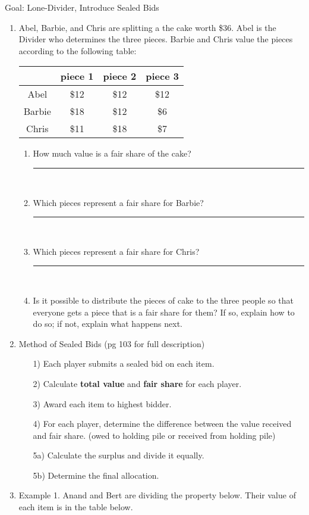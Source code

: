 \documentclass[12pt]{article}
\newcommand{\ans}[1][1in]{\rule{#1}{.5pt}}
\begin{document}
Goal: Lone-Divider, Introduce Sealed Bids
\begin{enumerate}
\item Abel, Barbie, and Chris are splitting a the cake worth \$36. Abel is the Divider who determines the three pieces. Barbie and Chris value the pieces according to the following table:

\begin{center}
\begin{tabular}{| c | c | c | c |}
\hline
& piece 1& piece 2 & piece 3\\ \hline \hline
Abel& \$12 & \$12 & \$12 \\ \hline
Barbie & \$18 & \$12 & \$6 \\ \hline
Chris & \$11 & \$18 & \$7\\ \hline
\end{tabular}
\end{center}
	\begin{enumerate}
	\item How much value is a fair share of the cake? \ans\\
	\vfill
	\item Which pieces represent a fair share  for Barbie? \ans[2in]\\
	\vfill
\item Which pieces represent a fair share  for Chris? \ans[2in]\\
\vfill
\item Is it possible to distribute the pieces of cake to the three people so that everyone gets a piece that is a fair share for them? If so, explain how to do so; if not, explain what happens next.
\vfill

\vfill
	\end{enumerate}
\item Method of Sealed Bids (pg 103 for full description)
	\begin{enumerate}
	\item[1)] Each player submits a sealed bid on each item. 
	\item[2)] Calculate \textbf{total value} and \textbf{fair share} for each player.
	\item[3)] Award each item to highest bidder.
	\item[4)] For each player, determine the difference between the value received and fair share. (owed to holding pile or received from holding pile)
	\item[5a)] Calculate the surplus and divide it equally.
	\item[5b)] Determine the final allocation.
	\end{enumerate}
\newpage
\item Example 1. Anand and Bert are dividing the property below. Their value of each item is in the table below.


\end{enumerate}
\end{document}
